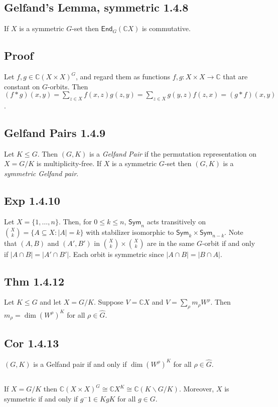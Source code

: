 \documentclass[a4paper]{amsart}
\newcommand{\C}{\mathbb{C}}
\newcommand{\Sym}{\mathsf{Sym}}
\newcommand{\End}{\mathsf{End}}
\newcommand{\Size}[1]{\left|#1\right|}
\begin{document}
\subsection{Gelfand's Lemma, symmetric 1.4.8}
If  $X$ is a symmetric $G$-set  then $\End_G(\C X)$ is commutative.

\subsection{Proof}
Let $f, g \in \C (X \times X)^G$, and regard them as functions
$f, g \colon X \times X \to \C$ that are constant on $G$-orbits.
Then $(f \ast g)(x, y) 
= \sum_{z \in X} f(x, z) g(z, y)
= \sum_{z \in X} g(y, z) f(z, x)
= (g \ast f)(x, y)$.

\subsection{Gelfand Pairs 1.4.9}
Let $K \leq G$.  Then $(G, K)$ is a \emph{Gelfand Pair} if the
permutation representation on $X = G/K$ is multiplicity-free.  If $X$
is a symmetric $G$-set then $(G,K)$ is a \emph{symmetric Gelfand
  pair}.

\subsection{Exp 1.4.10}
Let $X = \{1, \dots,n\}$.  Then, for $0 \leq k \leq n$, 
$\Sym_n$ acts transitively on $\binom{X}{k} = \{A \subseteq X : \Size{A} = k\}$
with stabilizer isomorphic to $\Sym_k \times \Sym_{n-k}$.
Note that $(A, B)$ and $(A', B')$ in $\binom{X}{k} \times \binom{X}{k}$
are in the same $G$-orbit if and only if $\Size{A \cap B} = \Size{A' \cap B'}$.
Each orbit is symmetric since $\Size{A \cap B}  = \Size{B \cap A}$.


\subsection{Thm 1.4.12}
Let $K \leq G$ and let $X = G/K$. Suppose $V =\C X$ and $V =
\sum_{\rho} m_{\rho} W^{\rho}$.  Then $m_{\rho} = \dim (W^{\rho})^K$
for all $\rho \in \hat{G}$.

\subsection{Cor 1.4.13}
$(G, K)$ is a Gelfand pair if and only if $\dim (W^{\rho})^K$ for all $\rho \in \hat{G}$.


\subsection{}
If $X = G/K$ then
$\C(X \times X)^G \cong \C X^K \cong \C (K\backslash G/K)$.
Moreover, $X$ is symmetric if and only if $g^-1 \in KgK$ for
all $g\in G$.
\end{document}
